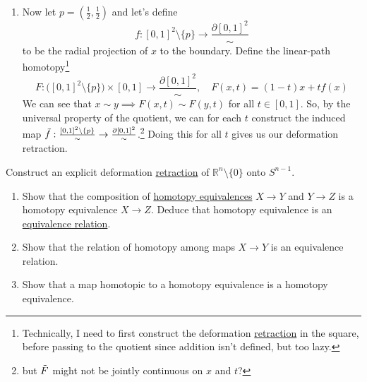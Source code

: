 \begin{solution}
\begin{enumerate}
			\item Now let $p = (\frac{1}{2}, \frac{1}{2})$ and let's define 
				\begin{equation}
					f: [0, 1]^2 \setminus \{p\} \to \frac{\partial [0, 1]^2} {\sim}
				\end{equation}
				to be the radial projection of $x$ to the boundary. Define the linear-path homotopy\footnote{Technically, I need to first construct the deformation \hyperref[def:retraction]{retraction} in the square, before passing to the quotient since addition isn't defined, but too lazy.}
				\begin{equation}
					F: \big( [0, 1]^2 \setminus \{p\} \big) \times [0, 1] \to \frac{\partial [0, 1]^2}{\sim}, \quad F(x, t) = (1 - t)x + t f(x)
				\end{equation}
				We can see that $x \sim y \implies F(x, t) \sim F(y, t)$ for all $t \in [0, 1]$. So, by the universal property of the quotient, we can  for each $t$ construct the induced map $\Tilde{f}: \frac{[0, 1]^2 \setminus \{p\}}{\sim} \to \frac{\partial [0, 1]^2}{\sim}$.\footnote{but $\Tilde{F}$ might not be jointly continuous on $x$ and $t$?} Doing this for all $t$ gives us our deformation retraction.

				\begin{figure}[H]
					\centering 
				\end{figure}
		\end{enumerate}
	\end{solution}

	\begin{exercise}[Hatcher 0.2]
		Construct an explicit deformation \hyperref[def:retraction]{retraction} of $\mathbb{R}^n \setminus \{0\}$ onto $S^{n-1}$.
	\end{exercise}

	\begin{exercise}[Hatcher 0.3]
		\begin{enumerate}
			\item[(a)] Show that the composition of \hyperref[def:homotopy-equivalence]{homotopy equivalences} $X \to Y$ and $Y \to Z$ is a homotopy equivalence $X \to Z$. Deduce that homotopy equivalence is an \hyperref[st-def:equivalence_relation]{equivalence relation}.
			\item[(b)] Show that the relation of homotopy among maps $X \to Y$ is an equivalence relation.
			\item[(c)] Show that a map homotopic to a homotopy equivalence is a homotopy equivalence.
		\end{enumerate}
	\end{exercise}

